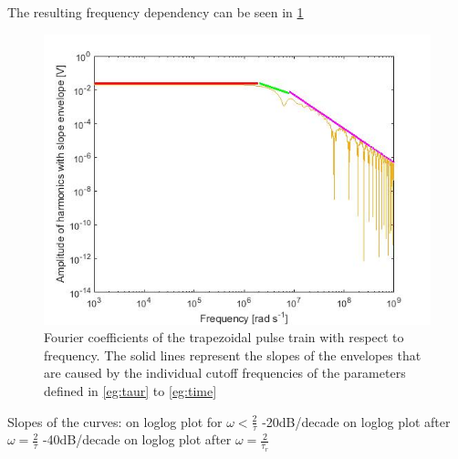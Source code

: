 The resulting frequency dependency can be seen in  \ref{fig.envelope}
\begin{figure}[h!tb]
\includegraphics[width=\textwidth]{figures/Method/signal_simulation/envelope.jpg}
\caption[Kurze Abbildungsbeschreibung]{Fourier coefficients of the trapezoidal pulse train with respect to frequency. The solid lines represent the slopes of the envelopes that are caused by the individual 
cutoff frequencies of the parameters defined in \eqref{eg:taur} to \eqref{eg:time}}
\label{fig.envelope}
\end{figure}


Slopes of the curves:  on loglog plot for $\omega < \frac{2}{\tau}$\newline
-20dB/decade on loglog plot after $\omega = \frac{2}{\tau}$ \newline
-40dB/decade on loglog plot after $\omega = \frac{2}{\tau_r}$\newline



	
